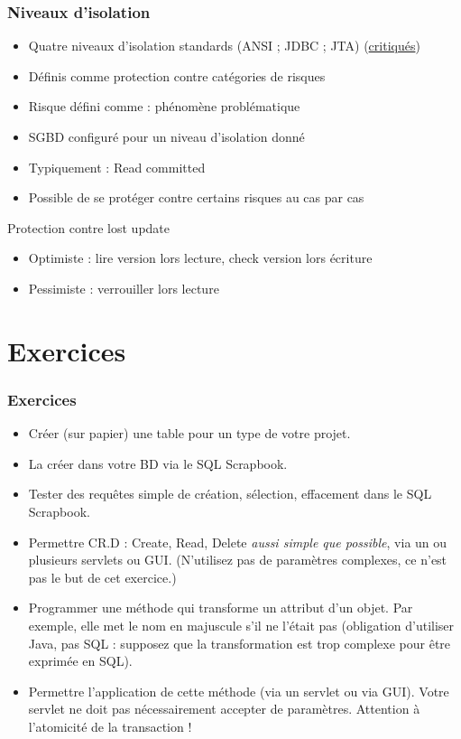 \documentclass[english, french]{beamer}
\begin{document}
\begin{frame}
	\frametitle{Niveaux d’isolation}
	\begin{itemize}
		\item Quatre niveaux d’isolation standards (ANSI ; JDBC ; JTA) {\tiny (\href{http://www.cs.umb.edu/~poneil/iso.pdf}{critiqués})}
		\item Définis comme protection contre catégories de risques
		\item Risque défini comme : phénomène problématique
		\item SGBD configuré pour un niveau d’isolation donné
		\item Typiquement : Read committed
		\item Possible de se protéger contre certains risques au cas par cas
	\end{itemize}
	\begin{block}{Protection contre  lost update}
		\begin{itemize}
			\item Optimiste : lire version lors lecture, check version lors écriture
			\item Pessimiste : verrouiller lors lecture
		\end{itemize}
	\end{block}
\end{frame}

\section{Exercices}
\begin{frame}[allowframebreaks]
	\frametitle{Exercices}
	\begin{itemize}
		\item Créer (sur papier) une table pour un type de votre projet.
		\item La créer dans votre BD via le SQL Scrapbook.
		\item Tester des requêtes simple de création, sélection, effacement dans le SQL Scrapbook.
		\item[+\footnote{Le + indique que cet aspect intervient dans la note}] Permettre CR.D : Create, Read, Delete \emph{aussi simple que possible}, via un ou plusieurs servlets ou GUI. (N’utilisez pas de paramètres complexes, ce n’est pas le but de cet exercice.)
		\item Programmer une méthode qui transforme un attribut d’un objet. Par exemple, elle met le nom en majuscule s’il ne l’était pas (obligation d’utiliser Java, pas SQL : supposez que la transformation est trop complexe pour être exprimée en SQL).
		\item[+] \label{Exercices} Permettre l’application de cette méthode (via un servlet ou via GUI). Votre servlet ne doit pas nécessairement accepter de paramètres. Attention à l’atomicité de la transaction !
	\end{itemize}
\end{frame}
\end{document}
